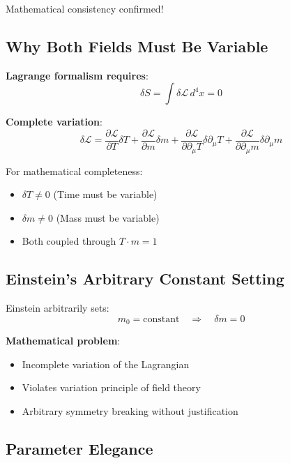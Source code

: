 	Mathematical consistency confirmed!
	
	\subsection{Why Both Fields Must Be Variable}
	
	\textbf{Lagrange formalism requires}:
	\begin{equation}
		\delta S = \int \delta \mathcal{L} \, d^4x = 0
	\end{equation}
	
	\textbf{Complete variation}:
	\begin{equation}
		\delta \mathcal{L} = \frac{\partial \mathcal{L}}{\partial T}\delta T + \frac{\partial \mathcal{L}}{\partial m}\delta m + \frac{\partial \mathcal{L}}{\partial \partial_\mu T}\delta \partial_\mu T + \frac{\partial \mathcal{L}}{\partial \partial_\mu m}\delta \partial_\mu m
	\end{equation}
	
	For mathematical completeness:
	\begin{itemize}
		\item $\delta T \neq 0$ (Time must be variable)
		\item $\delta m \neq 0$ (Mass must be variable)
		\item Both coupled through $T \cdot m = 1$
	\end{itemize}
	
	\subsection{Einstein's Arbitrary Constant Setting}
	
	Einstein arbitrarily sets:
	\begin{equation}
		m_0 = \text{constant} \quad \Rightarrow \quad \delta m = 0
	\end{equation}
	
	\textbf{Mathematical problem}:
	\begin{itemize}
		\item Incomplete variation of the Lagrangian
		\item Violates variation principle of field theory
		\item Arbitrary symmetry breaking without justification
	\end{itemize}
	
	\subsection{Parameter Elegance}
	
